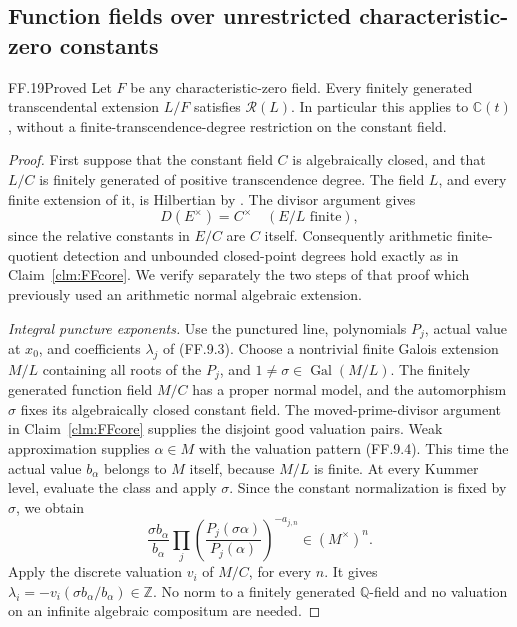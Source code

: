 \subsection{Function fields over unrestricted characteristic-zero constants}

\begin{claim}{FF.19}{Proved}\label{clm:FFfunction}
Let \(F\) be any characteristic-zero field. Every finitely
 generated transcendental extension \(L/F\) satisfies
\(\mathcal R(L)\). In particular this applies to
\(\mathbb C(t)\), without a finite-transcendence-degree
restriction on the constant field.
\end{claim}
\begin{proof}
First suppose that the constant field \(C\) is algebraically
closed, and that \(L/C\) is finitely generated of positive
transcendence degree. The field \(L\), and every finite extension
of it, is Hilbertian by
\citet[Theorem~1.2, Corollary~3.2]{FF_BarySorokerParan2013}.
The divisor argument gives
\[
                     D(E^\times)=C^\times
        \quad(E/L\text{ finite}),                         \tag{FF.19.1}
\]
since the relative constants in \(E/C\) are \(C\) itself.
Consequently arithmetic finite-quotient detection and unbounded
closed-point degrees hold exactly as in Claim~\ref{clm:FFcore}.
We verify separately the two steps of that proof which previously
used an arithmetic normal algebraic extension.

\emph{Integral puncture exponents.}
Use the punctured line, polynomials \(P_j\), actual value at
\(x_0\), and coefficients \(\lambda_j\) of (FF.9.3).
Choose a nontrivial finite Galois extension \(M/L\) containing
all roots of the \(P_j\), and
\(1\ne\sigma\in\operatorname{Gal}(M/L)\).
The finitely generated function field \(M/C\) has a proper
normal model, and the automorphism \(\sigma\) fixes its
algebraically closed constant field. The moved-prime-divisor
argument in Claim~\ref{clm:FFcore} supplies the disjoint good
valuation pairs. Weak approximation supplies \(\alpha\in M\)
with the valuation pattern (FF.9.4).
This time the actual value \(b_\alpha\) belongs to \(M\)
itself, because \(M/L\) is finite. At every Kummer level,
evaluate the class and apply \(\sigma\). Since the constant
normalization is fixed by \(\sigma\), we obtain
\[
 \frac{\sigma b_\alpha}{b_\alpha}
        \prod_j\left(\frac{P_j(\sigma\alpha)}
                            {P_j(\alpha)}\right)^{-a_{j,n}}
                         \in(M^\times)^n.
\]
Apply the discrete valuation \(v_i\) of \(M/C\), for every
\(n\). It gives
\(\lambda_i=-v_i(\sigma b_\alpha/b_\alpha)\in\mathbb Z\).
No norm to a finitely generated \(\mathbb Q\)-field and no
valuation on an infinite algebraic compositum are needed.


\end{proof}
